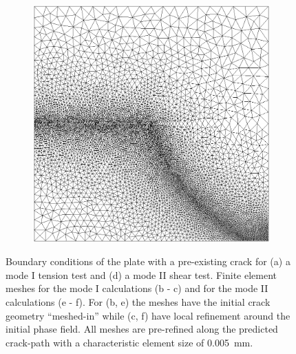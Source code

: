 \begin{figure}[htb!]
\begin{subfigure}[b]{0.19\textwidth}
    \caption{}
    \label{fig: Chapter4/mode2_notch_mesh}
  \end{subfigure}
  \hspace{0.05\textwidth}
  \begin{subfigure}[b]{0.19\textwidth}
    \centering
    \includegraphics[width=\textwidth]{Chapter4/figures/mode2_initial_mesh.png}
    \caption{}
    \label{fig: Chapter4/mode2_initial_mesh}
  \end{subfigure}
  \caption[Boundary conditions of the plate with a pre-existing crack for a mode I tension test and a mode II shear test.]{Boundary conditions of the plate with a pre-existing crack for (a) a mode I tension test and (d) a mode II shear test. Finite element meshes for the mode I calculations (b - c) and for the mode II calculations (e - f). For (b, e) the meshes have the initial crack geometry ``meshed-in'' while (c, f) have local refinement around the initial phase field. All meshes are pre-refined along the predicted crack-path with a characteristic element size of \SI{0.005}{\milli\meter}.}
  \label{fig: example/bcs}
\end{figure}
